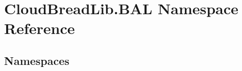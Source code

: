 \hypertarget{namespace_cloud_bread_lib_1_1_b_a_l}{}\section{Cloud\+Bread\+Lib.\+B\+AL Namespace Reference}
\label{namespace_cloud_bread_lib_1_1_b_a_l}
\subsection*{Namespaces}
\begin{DoxyCompactItemize}
\end{DoxyCompactItemize}
